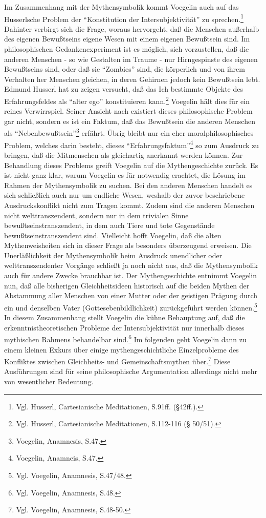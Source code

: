 Im Zusammenhang mit der Mythensymbolik kommt Voegelin auch auf das
Husserlsche Problem der "`Konstitution der Intersubjektivität"' zu
sprechen.\footnote{Vgl.  Husserl, Cartesianische Meditationen, S.91ff.
  (§42ff.).} Dahinter verbirgt sich die Frage, woraus hervorgeht, daß
die Menschen außerhalb des eigenen Bewußtseins eigene Wesen mit einem
eigenen Bewußtsein sind. Im philosophischen Gedankenexperiment ist es
möglich, sich vorzustellen, daß die anderen Menschen - so wie Gestalten
im Traume - nur Hirngespinste des eigenen Bewußtseins sind, oder daß sie
"`Zombies"' sind, die körperlich und von ihrem Verhalten her Menschen
gleichen, in deren Gehirnen jedoch kein Bewußtsein lebt. Edmund Husserl
hat zu zeigen versucht, daß das Ich bestimmte Objekte des
Erfahrungsfeldes als "`alter ego"' konstituieren kann.\footnote{Vgl.
  Husserl, Cartesianische Meditationen, S.112-116 (§ 50/51).} Voegelin
hält dies für ein reines Verwirrspiel. Seiner Ansicht nach existiert
dieses philosophische Problem gar nicht, sondern es ist ein Faktum, daß
das Bewußtsein die anderen Menschen als
"`Nebenbewußtsein"'\footnote{Voegelin, Anamnesis, S.47.} erfährt. Übrig
bleibt nur ein eher moralphilosophisches Problem, welches darin besteht,
dieses "`Erfahrungsfaktum"'\footnote{Voegelin, Anamneis, S.47.} so zum
Ausdruck zu bringen, daß die Mitmenschen als gleichartig anerkannt
werden können. Zur Behandlung dieses Problems greift Voegelin auf die
Mythengeschichte zurück. Es ist nicht ganz klar, warum Voegelin es für
notwendig erachtet, die Lösung im Rahmen der Mythensymbolik zu suchen.
Bei den anderen Menschen handelt es sich schließlich auch nur um
endliche Wesen, weshalb der zuvor beschriebene Ausdruckskonflikt nicht
zum Tragen kommt. Zudem sind die anderen Menschen nicht
welttranszendent, sondern nur in dem trivialen Sinne
bewußtseinstranszendent, in dem auch Tiere und tote Gegenstände
bewußtseinstranszendent sind. Vielleicht hofft Voegelin, daß die alten
Mythenweisheiten sich in dieser Frage als besonders überzeugend
erweisen. Die Unerläßlichkeit der Mythensymbolik beim Ausdruck
unendlicher oder welttranszendenter Vorgänge schließt ja noch nicht aus,
daß die Mythensymbolik auch für andere Zwecke brauchbar ist. Der
Mythengeschichte entnimmt Voegelin nun, daß alle bisherigen
Gleichheitsideen historisch auf die beiden Mythen der Abstammung aller
Menschen von einer Mutter oder der geistigen Prägung durch ein und
denselben Vater (Gottesebenbildlichkeit) zurückgeführt werden
können.\footnote{Vgl. Voegelin, Anamnesis, S.47/48.} In diesem
Zusammenhang stellt Voegelin die kühne Behauptung auf, daß die
erkenntnistheoretischen Probleme der Intersubjektivität nur innerhalb
dieses mythischen Rahmens behandelbar sind.\footnote{Vgl. Voegelin,
  Anamnesis, S.48.} Im folgenden geht Voegelin dann zu einem kleinen
Exkurs über einige mythengeschichtliche Einzelprobleme des Konfliktes
zwischen Gleichheits- und Gemeinschaftsmythen über.\footnote{Vgl.
  Voegelin, Anamnesis, S.48-50.} Diese Ausführungen sind für seine
philosophische Argumentation allerdings nicht mehr von wesentlicher
Bedeutung.

